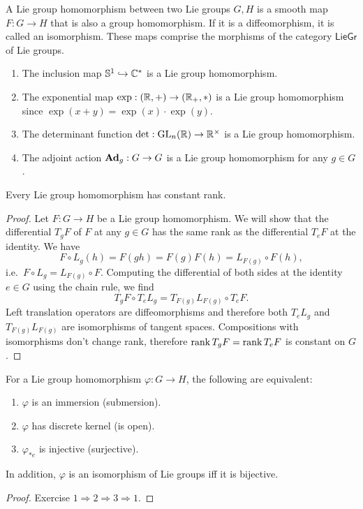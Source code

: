\begin{defn}
    A Lie group homomorphism between two Lie groups $G,H$ is a smooth map $F:G\to H$ that is also a group homomorphism. If it is a diffeomorphism, it is called an isomorphism. These maps comprise the morphisms of the category $\mathsf{LieGr}$ of Lie groups.
\end{defn} 

\begin{example}
    \begin{enumerate}[label=(\alph*)]
        \item The inclusion map $\mathbb{S}^1\hookrightarrow \mathbb{C}^\ast$ is a Lie group homomorphism.
        \item The exponential map $\exp:(\mathbb{R} ,+)\to (\mathbb{R}_+,*)$ is a Lie group homomorphism since $\exp(x+y)=\exp(x)\cdot \exp(y)$.
        \item The determinant function $\det:\operatorname{GL}_n(\mathbb{R} )\to \mathbb{R}^\times$ is a Lie group homomorphism.
        \item The adjoint action $\mathrm{\mathbf{Ad}}_g:G\to G$ is a Lie group homomorphism for any $g\in G$.
    \end{enumerate}
\end{example}

\begin{thm}
    Every Lie group homomorphism has constant rank.
\end{thm}
\begin{proof}
    Let $F:G\to H$ be a Lie group homomorphism. We will show that the differential $T_g F$ of $F$ at any $g\in G$ has the same rank as the differential $T_eF$ at the identity. We have
    \[F\circ L_g (h)=F(gh)=F(g)F(h)=L_{F(g)}\circ F(h),\]
    i.e.~$F\circ L_g=L_{F(g)}\circ F$. Computing the differential of both sides at the identity $e\in G$ using the chain rule, we find
    \[T_gF\circ T_e L_g=T_{F(g)}L_{F(g)}\circ T_e F.\]
    Left translation operators are diffeomorphisms and therefore both $T_e L_g$ and $T_{F(g)}L_{F(g)}$ are isomorphisms of tangent spaces. Compositions with isomorphisms don't change rank, therefore $\operatorname{rank} T_gF=\operatorname{rank} T_e F$ is constant on $G$.
\end{proof}
\begin{cor}[{{\cite[Cor.~5.3.7]{RS1}}}]\label{cor 5.3.7 RS1}
    For a Lie group homomorphism $\varphi:G\to H$, the following are equivalent:
    \begin{enumerate}
        \item $\varphi$ is an immersion (submersion).
        \item $\varphi$ has discrete kernel (is open).
        \item $\varphi_{\ast e}$ is injective (surjective).
    \end{enumerate}
    In addition, $\varphi$ is an isomorphism of Lie groups iff it is bijective.
\end{cor}
\begin{proof}
    Exercise $1\Rightarrow 2\Rightarrow 3 \Rightarrow 1$.
\end{proof}

